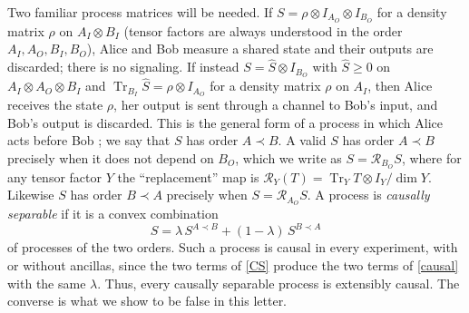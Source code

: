 \documentclass[aps,prl,reprint,superscriptaddress,nofootinbib,longbibliography,raggedbottom]{revtex4-2}
\DeclareMathOperator{\Tr}{Tr}
\newcommand{\R}{\mathcal R}
\begin{document}
Two familiar process matrices will be needed. If
$S=\rho\otimes I_{A_O}\otimes I_{B_O}$
for a density matrix $\rho$ on $A_I\otimes B_I$ (tensor factors are always
understood in the order $A_I,A_O,B_I,B_O$), Alice and Bob measure a shared
state and their outputs are discarded; there is no signaling. If instead $S=\widehat S\otimes
I_{B_O}$ with $\widehat S\geq0$ on $A_I\otimes A_O\otimes B_I$ and
$\Tr_{B_I}\widehat S=\rho\otimes I_{A_O}$ for a density matrix $\rho$ on
$A_I$, then Alice receives the state $\rho$, her output is sent through a
channel to Bob's input, and Bob's output is discarded. This is the general
form of a process in which Alice acts before Bob \cite{CDP}; we say that
$S$ has order $A\prec B$. A valid $S$ has order $A\prec B$ precisely when
it does not depend on $B_O$, which we write as $S=\R_{B_O}S$, where for any
tensor factor $Y$ the ``replacement'' map is
$\R_Y(T)=\Tr_YT\otimes I_Y/\dim Y$. Likewise $S$ has order $B\prec A$
precisely when $S=\R_{A_O}S$. A process is \emph{causally separable} if it
is a convex combination
\begin{equation}\label{CS}
S=\lambda\,S^{A\prec B}+(1-\lambda)\,S^{B\prec A}
\end{equation}
of processes of the two orders. Such a process is causal in every
experiment, with or without ancillas, since the two terms of \eqref{CS}
produce the two terms of \eqref{causal} with the same $\lambda$. Thus, every causally separable process is extensibly causal. The converse is what we show to be false in this letter. 
\end{document}
